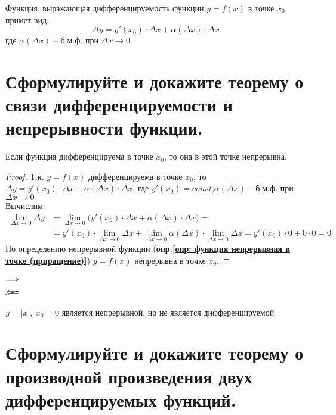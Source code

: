 \begin{corollary}
  Функция, выражающая дифференцируемость функции $y=f(x)$ в точке $x_0$ примет вид:
  \[ \boxed{\Delta y = y'(x_0)\cdot \Delta x + \alpha (\Delta x) \cdot \Delta x} \]
  где $\alpha (\Delta x)$ -- б.м.ф. при $\Delta x \to 0$
\end{corollary}

\newpage
\section{Сформулируйте и докажите теорему о связи дифференцируемости и непрерывности функции.}

\begin{theorem} 
  Если функция дифференцируема в точке $x_0$, то она в этой точке непрерывна.
\end{theorem}
\begin{proof}
  Т.к. $y=f(x)$ дифференцируема в точке $x_0$, то $\Delta y = y'(x_0)\cdot \Delta x + \alpha (\Delta x) \cdot \Delta x$, где $y'(x_0) = const$,\quad $\alpha (\Delta x)$ -- б.м.ф. при $\Delta x \to 0$\\
  Вычислим:
  \begin{align*}
  \lim\limits_{\Delta x \to 0} \Delta y &= \lim\limits_{\Delta x \to 0} \big(y'(x_0)\cdot \Delta x + \alpha (\Delta x) \cdot \Delta x\big) = \\
  &= y'(x_0)\cdot \lim\limits_{\Delta x \to 0} \Delta x + \lim\limits_{\Delta x \to 0} \alpha(\Delta x)\cdot \lim\limits_{\Delta x \to 0} \Delta x = y'(x_0) \cdot 0 + 0\cdot 0 = 0
  \end{align*}
  По определению непрерывной функции (\textbf{опр.\ref{опр: функция непрерывная в точке (приращение)}}) $y=f(x)$ непрерывна в точке $x_0$.
\end{proof}
\begin{center}
   $\begin{aligned} \Longrightarrow\\ \cancel{\Longleftarrow} \end{aligned}$ 
\end{center}
\begin{eg}
  $y = |x|,\ x_0 = 0$ является непрерывной, но не является дифференцируемой
\end{eg}

\section{Сформулируйте и докажите теорему о производной произведения двух дифференцируемых функций.}

